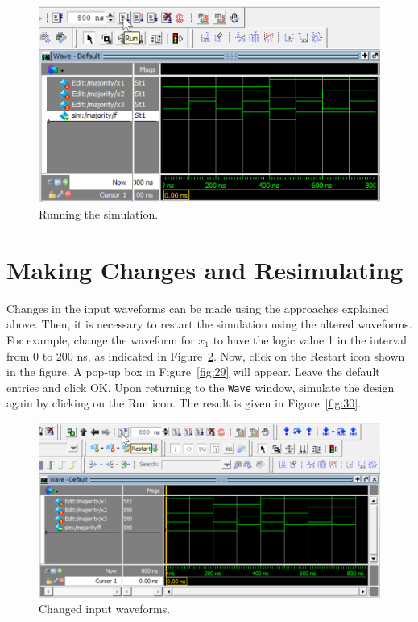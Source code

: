 \documentclass[11pt, twoside, pdftex]{article}
\begin{document}
\begin{figure}[H]
   \begin{center}
      \includegraphics[scale=0.75]{figures/sim_run.png}
   \caption{Running the simulation.} 
	 \label{fig:26}
	 \end{center}
\end{figure}

\section{Making Changes and Resimulating}

Changes in the input waveforms can be made using the approaches explained above. Then, it
is necessary to restart the simulation using the altered waveforms. For example, change the
waveform for $x_1$ to have the logic value 1 in the interval from 0 to 200 ns, as indicated
in Figure~\ref{fig:28}. Now, click on the {\sf Restart} icon shown in the figure. A pop-up box in
Figure~\ref{fig:29} will appear. Leave the default entries and click {\sf OK}. Upon returning 
to the \texttt{Wave} window, simulate the design again by clicking on the {\sf Run} icon. 
The result is given in Figure~\ref{fig:30}.

\begin{figure}[H]
   \begin{center}
      \includegraphics[scale=1.0]{figures/figure28.png}
   \caption{Changed input waveforms.} 
	 \label{fig:28}
	 \end{center}
\end{figure}
\end{document}
